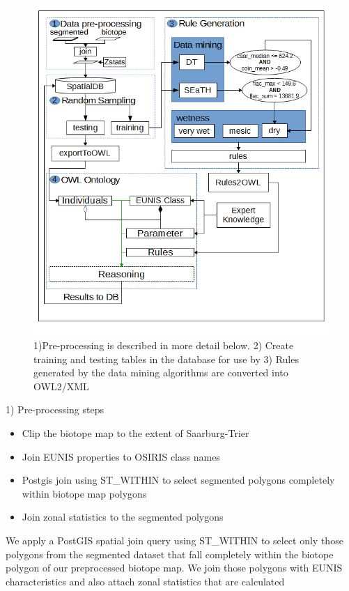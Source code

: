\documentclass[authoryear, review,12pt,number]{elsarticle}
\begin{document}
\begin{figure}
	\includegraphics{diagrams/another_workflow_diagram_large.png}
	\caption{1)Pre-processing is described in more detail below. 2) Create 
training and testing tables in the database for use by 3) 
Rules generated by the data mining algorithms are converted into OWL2/XML }
\end{figure}
1) Pre-processing steps
\begin{itemize}
    \item Clip the biotope map to the extent of Saarburg-Trier
    \item Join EUNIS properties to OSIRIS class names
    \item Postgis join using ST\_WITHIN to select segmented polygons completely
        within biotope map polygons
    \item Join zonal statistics to the segmented polygons
\end{itemize}
We apply a PostGIS spatial join query using ST\_WITHIN to select only those
polygons from the segmented dataset that fall completely within the biotope
polygon of our preprocessed biotope map. We join those polygons
with EUNIS characteristics and also attach zonal statistics that are calculated
\end{document}
